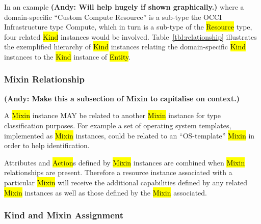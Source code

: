 \documentclass[10pt,a4paper]{article}
\begin{document}
In an example \textbf{(Andy: Will help hugely if shown graphically.)} where a 
domain-specific ``Custom Compute Resource'' is a sub-type
the OCCI Infrastructure type Compute, which in turn is a sub-type of the
\hl{Resource} type, four related \hl{Kind} instances would be involved.
%
Table~\ref{tbl:relationship} illustrates the exemplified hierarchy of \hl{Kind}
instances relating the domain-specific \hl{Kind} instances to the \hl{Kind}
instance of \hl{Entity}.


\subsubsection{Mixin Relationship}
\label{sec:mixin_relationship}

\textbf{(Andy: Make this a subsection of Mixin to capitalise on context.)}

A \hl{Mixin} instance MAY be related to another \hl{Mixin} instance for
type classification purposes. For example a set of operating system templates,
implemented as \hl{Mixin} instances, could be related to an ``OS-template''
\hl{Mixin} in order to help identification.

Attributes and \hl{Action}s defined by \hl{Mixin} instances are combined when
\hl{Mixin} relationships are present. Therefore a resource instance associated
with a particular \hl{Mixin} will receive the additional capabilities defined
by any related \hl{Mixin} instances as well as those defined by the \hl{Mixin}
associated.

\subsubsection{Kind and Mixin Assignment}
\label{sec:assignment}
\end{document}
